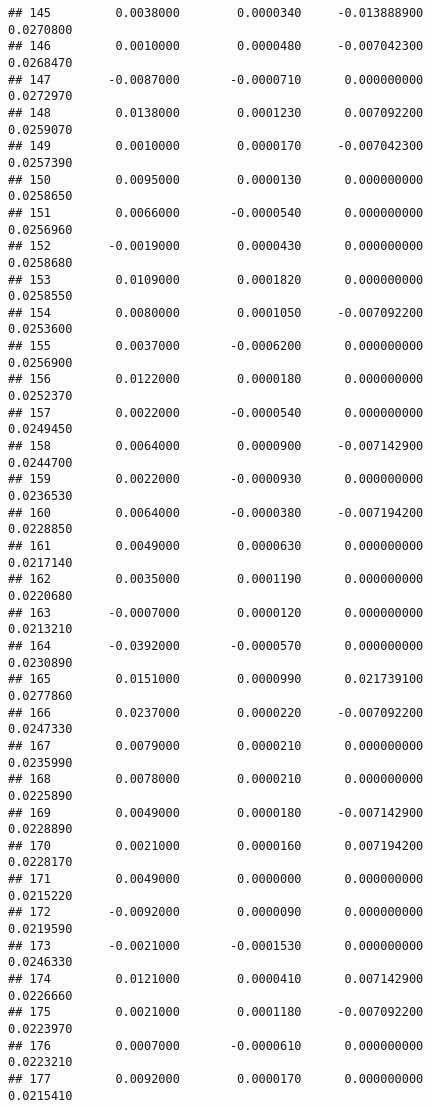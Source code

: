 \documentclass[
]{article}
\begin{document}
\begin{verbatim}
## 145         0.0038000        0.0000340     -0.013888900             0.0270800
## 146         0.0010000        0.0000480     -0.007042300             0.0268470
## 147        -0.0087000       -0.0000710      0.000000000             0.0272970
## 148         0.0138000        0.0001230      0.007092200             0.0259070
## 149         0.0010000        0.0000170     -0.007042300             0.0257390
## 150         0.0095000        0.0000130      0.000000000             0.0258650
## 151         0.0066000       -0.0000540      0.000000000             0.0256960
## 152        -0.0019000        0.0000430      0.000000000             0.0258680
## 153         0.0109000        0.0001820      0.000000000             0.0258550
## 154         0.0080000        0.0001050     -0.007092200             0.0253600
## 155         0.0037000       -0.0006200      0.000000000             0.0256900
## 156         0.0122000        0.0000180      0.000000000             0.0252370
## 157         0.0022000       -0.0000540      0.000000000             0.0249450
## 158         0.0064000        0.0000900     -0.007142900             0.0244700
## 159         0.0022000       -0.0000930      0.000000000             0.0236530
## 160         0.0064000       -0.0000380     -0.007194200             0.0228850
## 161         0.0049000        0.0000630      0.000000000             0.0217140
## 162         0.0035000        0.0001190      0.000000000             0.0220680
## 163        -0.0007000        0.0000120      0.000000000             0.0213210
## 164        -0.0392000       -0.0000570      0.000000000             0.0230890
## 165         0.0151000        0.0000990      0.021739100             0.0277860
## 166         0.0237000        0.0000220     -0.007092200             0.0247330
## 167         0.0079000        0.0000210      0.000000000             0.0235990
## 168         0.0078000        0.0000210      0.000000000             0.0225890
## 169         0.0049000        0.0000180     -0.007142900             0.0228890
## 170         0.0021000        0.0000160      0.007194200             0.0228170
## 171         0.0049000        0.0000000      0.000000000             0.0215220
## 172        -0.0092000        0.0000090      0.000000000             0.0219590
## 173        -0.0021000       -0.0001530      0.000000000             0.0246330
## 174         0.0121000        0.0000410      0.007142900             0.0226660
## 175         0.0021000        0.0001180     -0.007092200             0.0223970
## 176         0.0007000       -0.0000610      0.000000000             0.0223210
## 177         0.0092000        0.0000170      0.000000000             0.0215410

\end{verbatim}
\end{document}
